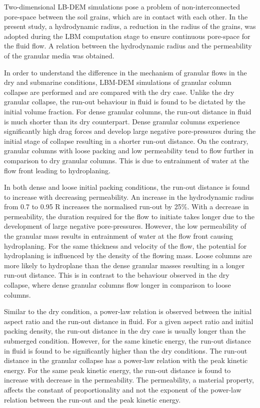 Two-dimensional LB-DEM simulations pose a problem of non-interconnected 
pore-space between the soil grains, which are in contact with each other. In 
the present study, a hydrodynamic radius, a reduction in the radius of the 
grains, was adopted during the LBM computation stage to ensure continuous 
pore-space for the fluid flow. A relation between the hydrodynamic radius and 
the permeability of the granular media was obtained. 

In order to understand the difference in the mechanism of granular flows in the 
dry and submarine conditions, LBM-DEM simulations of granular column collapse 
are performed and are compared with the dry case. Unlike the dry granular 
collapse, the run-out behaviour in fluid is found to be dictated by the initial 
volume fraction. For dense granular columns, the run-out distance in fluid is 
much shorter than its dry counterpart. Dense granular columns experience 
significantly high drag forces and develop large negative pore-pressures during 
the initial stage of collapse resulting in a shorter run-out distance. On the 
contrary, granular columns with loose packing and low permeability tend to flow 
further in comparison to dry granular columns. This is due to entrainment of 
water at the flow front leading to hydroplaning. 

In both dense and loose initial packing conditions, the run-out distance is 
found to increase with decreasing permeability. An increase in the 
hydrodynamic radius from 0.7 to 0.95 R increases the
normalised run-out by 25\%. With a decrease in permeability, the duration 
required for the flow to initiate takes longer due to the development of large 
negative pore-pressures. However, the low permeability of the granular mass 
results in entrainment of water at the flow front causing hydroplaning. For the 
same thickness and velocity of the flow, the potential for hydroplaning is 
influenced by the density of the flowing mass. Loose columns are more likely to 
hydroplane than the dense granular masses resulting in a longer run-out 
distance. This is in contrast to the behaviour observed in the dry collapse, 
where dense granular columns flow longer in comparison to loose columns.

Similar to the dry condition, a power-law relation is observed between the 
initial aspect ratio and the run-out distance in fluid. For a given 
aspect ratio and initial packing density, the run-out distance in the dry case 
is usually longer than the submerged condition. However, for the same kinetic 
energy, the run-out distance in fluid is found to be significantly higher than 
the dry conditions. The run-out distance in the granular collapse has a 
power-law relation with the peak kinetic energy. For the same peak kinetic 
energy, the run-out distance is found to increase with decrease in the 
permeability. The permeability, a material property, affects the constant of 
proportionality and not the exponent of the power-law relation between the 
run-out and the peak kinetic energy.

